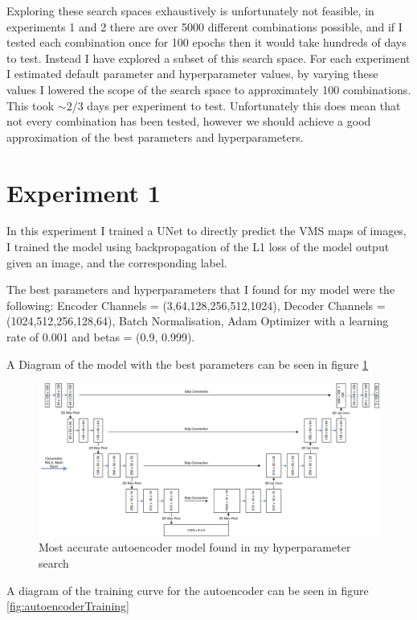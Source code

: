 \documentclass{UoYCSproject}
\begin{document}
Exploring these search spaces exhaustively is unfortunately not feasible, in experiments 1 and 2 there are over 5000 different combinations possible, and if I tested each combination once for 100 epochs then it would take hundreds of days to test.
Instead I have explored a subset of this search space. For each experiment I estimated default parameter and hyperparameter values, by varying these values I lowered the scope of the search space to approximately 100 combinations. This took \(\sim\)2/3 days per experiment to test. Unfortunately this does mean that not every combination has been tested, however we should achieve a good approximation of the best parameters and hyperparameters.

\section{Experiment 1}

In this experiment I trained a UNet to directly predict the VMS maps of images, I trained the model using backpropagation of the L1 loss of the model output given an image, and the corresponding label.

The best parameters and hyperparameters that I found for my model were the following: Encoder Channels = (3,64,128,256,512,1024), Decoder Channels = (1024,512,256,128,64), Batch Normalisation, Adam Optimizer with a learning rate of 0.001 and betas = (0.9, 0.999).

A Diagram of the model with the best parameters can be seen in figure \ref{fig:autoencoderDiagram}

\begin{figure}[h]
    \centering
    \includegraphics[width=\linewidth]{Experiment 1 Diagram}
    \caption{Most accurate autoencoder model found in my hyperparameter search}
    \label{fig:autoencoderDiagram}
\end{figure}


A diagram of the training curve for the autoencoder can be seen in figure \ref{fig:autoencoderTraining}
\end{document}
